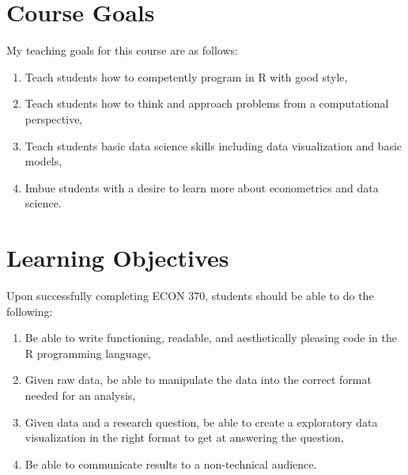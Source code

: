 \documentclass[11pt]{article}
\newcommand{\CourseNum}{370\xspace}         %
\begin{document}
\section*{Course Goals}
My teaching goals for this course are as follows:

\begin{enumerate}
    \item Teach students how to competently program in R with good style,
    \item Teach students how to think and approach problems from a computational perspective,
    \item Teach students basic data science skills including data visualization and basic models,
    \item Imbue students with a desire to learn more about econometrics and data science.
\end{enumerate}


\section*{Learning Objectives}
Upon successfully completing ECON \CourseNum, students should be able to do the following:

\begin{enumerate}
    \item Be able to write functioning, readable, and aesthetically pleasing code in the R programming language, 
    \item Given raw data, be able to manipulate the data into the correct format needed for an analysis,
    \item Given data and a research question, be able to create a exploratory data visualization in the right format to get at answering the question,
    \item Be able to communicate results to a non-technical audience.
\end{enumerate}


\end{document}
